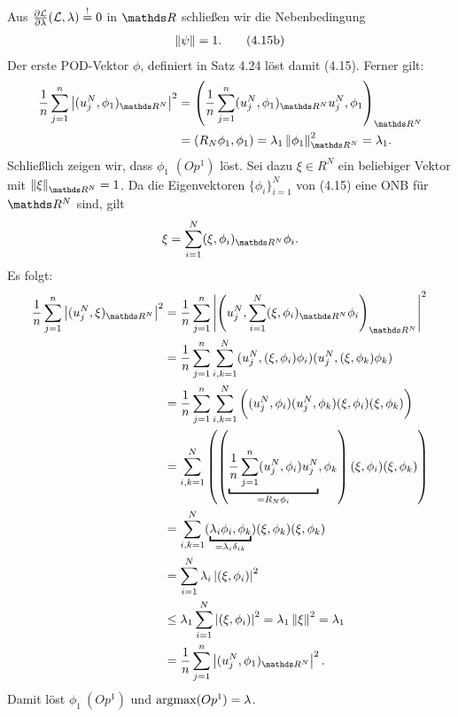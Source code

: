Aus $\frac{\partial \mathcal{L}}{\partial \lambda}  (\mathcal{L},\lambda) \stackrel{!}{=} 0$ in $\R$ schließen wir die Nebenbedingung
\begin{align*}
\left\Vert\psi\right\Vert=1. \tag*{(4.15b)}
\end{align*}
Der erste POD-Vektor $\phi$, definiert in Satz 4.24 löst damit (4.15).
Ferner gilt:
\begin{align*}
\frac{1}{n} \sum_{j=1}^n \abs{ (u_j^N,\phi_1)_{\R^N}}^2 &= \enbrace{\frac{1}{n} \sum_{j=1}^n (u_j^N,\phi_1)_{\R^N} u_j^N,\phi_1}_{\R^N}\\
&= (R_N\phi_1,\phi_1) = \lambda_1 \norm{\phi_1}^2_{\R^N} = \lambda_1.
\end{align*}
Schließlich zeigen wir, dass $\phi_1$ $(Op^1)$ löst.
Sei dazu $\xi\in R^N$ ein beliebiger Vektor mit $\norm{\xi}_{\R^N}=1$.
Da die Eigenvektoren $\{\phi_i\}_{i=1}^N$ von (4.15) eine ONB für $\R^N$ sind, gilt
\[
\xi = \sum_{i=1}^{N} (\xi,\phi_i)_{\R^N}\phi_i.
\]
Es folgt:
\begin{align*}
\frac{1}{n} \sum_{j=1}^n \abs{(u_j^N,\xi)_{\R^N}}^2 &= \frac{1}{n} \sum_{j=1}^n \abs{\enbrace{u_j^N, \sum_{i=1}^N(\xi,\phi_i)_{\R^N}\phi_i}_{\R^N}}^2\\
&= \frac{1}{n} \sum_{j=1}^n \sum_{i,k=1}^N (u_j^N,(\xi,\phi_i)\phi_i)(u_j^N,(\xi,\phi_k)\phi_k)\\
&= \frac{1}{n} \sum_{j=1}^n \sum_{i,k=1}^N \bigg( (u_j^N,\phi_i)(u_j^N,\phi_k)(\xi,\phi_i)(\xi,\phi_k)\bigg)\\
&= \sum_{i,k=1}^N \enbrace{ \enbrace{ \underbracket{\frac{1}{n} \sum_{j=1}^n (u_j^N,\phi_i)u_j^N}_{=R_N\phi_i},\phi_k}(\xi,\phi_i)(\xi,\phi_k)}\\
&= \sum_{i,k=1}^N  (\underbracket{\lambda_i\phi_i,\phi_k}_{=\lambda_i\delta_{ik}})(\xi,\phi_k)(\xi,\phi_k)\\
&= \sum_{i=1}^N \lambda_i \abs{(\xi,\phi_i)}^2\\
&\le \lambda_1 \sum_{i=1}^N \abs{(\xi,\phi_i)}^2 = \lambda_1 \norm{\xi}^2 =\lambda_1\\
&= \frac{1}{n} \sum_{j=1}^n \abs{(u_j^N,\phi_1)_{\R^N}}^2.
\end{align*}
Damit löst $\phi_1~(Op^1)$ und $\operatorname{argmax} (Op^1) = \lambda$.

